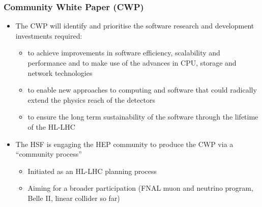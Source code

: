 \begin{frame}
\frametitle{Community White Paper (CWP)}

\begin{itemize}
\item The CWP will identify and prioritise the software research and development investments required:
   \begin{itemize} 
   \item to achieve improvements in software efficiency, scalability and performance and to make use of the advances in CPU, storage and network technologies
   \item to enable new approaches to computing and software that could radically extend the physics reach of the detectors
   \item to ensure the long term sustainability of the software through the lifetime of the HL-LHC
   \end{itemize} 
\vskip 0.15in
\item The HSF is engaging the HEP community to produce the CWP via a ``community process''
   \begin{itemize} 
   \item Initiated as an HL-LHC planning process
   \item Aiming for a broader participation (FNAL muon and neutrino program, Belle II, linear collider so far)
   \end{itemize} 
\end{itemize}

\end{frame}


